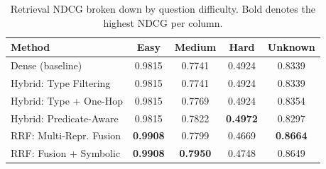 \begin{table}[ht]
  \centering
  \small
  \caption{Retrieval NDCG broken down by question difficulty. Bold denotes the highest NDCG per column.}
  \label{tab:retrieval_by_difficulty}
  \begin{tabular}{lcccc}
    \toprule
    \textbf{Method} & \textbf{Easy} & \textbf{Medium} & \textbf{Hard} & \textbf{Unknown} \\
    \midrule
    Dense (baseline) & 0.9815 & 0.7741 & 0.4924 & 0.8339 \\
    Hybrid: Type Filtering & 0.9815 & 0.7741 & 0.4924 & 0.8339 \\
    Hybrid: Type + One-Hop & 0.9815 & 0.7769 & 0.4924 & 0.8354 \\
    Hybrid: Predicate-Aware & 0.9815 & 0.7822 & \textbf{0.4972} & 0.8297 \\
    RRF: Multi-Repr. Fusion & \textbf{0.9908} & 0.7799 & 0.4669 & \textbf{0.8664} \\
    RRF: Fusion + Symbolic & \textbf{0.9908} & \textbf{0.7950} & 0.4748 & 0.8649 \\
    \bottomrule
  \end{tabular}
\end{table}